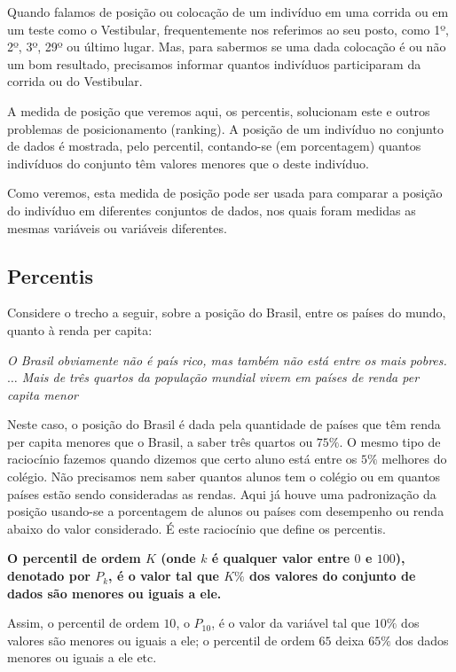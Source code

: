 \documentclass[
]{book}
\begin{document}
Quando falamos de posição ou colocação de um indivíduo em uma corrida ou em um teste como o Vestibular, frequentemente nos referimos ao seu posto, como 1º, 2º, 3º, 29º ou último lugar. Mas, para sabermos se uma dada colocação é ou não um bom resultado, precisamos informar quantos indivíduos participaram da corrida ou do Vestibular.

A medida de posição que veremos aqui, os percentis, solucionam este e outros problemas de posicionamento (ranking). A posição de um indivíduo no conjunto de dados é mostrada, pelo percentil, contando-se (em porcentagem) quantos indivíduos do conjunto têm valores menores que o deste indivíduo.

Como veremos, esta medida de posição pode ser usada para comparar a posição do indivíduo em diferentes conjuntos de dados, nos quais foram medidas as mesmas variáveis ou variáveis diferentes.

\hypertarget{percentis}{%
\subsection{Percentis}\label{percentis}}

Considere o trecho a seguir, sobre a posição do Brasil, entre os países do mundo, quanto à renda per capita:

\emph{O Brasil obviamente não é país rico, mas também não está entre os mais pobres. \(\ldots\) Mais de três quartos da população mundial vivem em países de renda per capita menor}

Neste caso, o posição do Brasil é dada pela quantidade de países que têm renda per capita menores que o Brasil, a saber três quartos ou \(75\%\). O mesmo tipo de raciocínio fazemos quando dizemos que certo aluno está entre os \(5\%\) melhores do colégio. Não precisamos nem saber quantos alunos tem o colégio ou em quantos países estão sendo consideradas as rendas. Aqui já houve uma padronização da posição usando-se a porcentagem de alunos ou países com desempenho ou renda abaixo do valor considerado. É este raciocínio que define os percentis.

\textbf{O percentil de ordem $K$ (onde $k$ é qualquer valor entre $0$ e $100$), denotado por $P_k$, é o valor tal que $K\%$ dos valores do conjunto de dados são menores ou iguais a ele.}

Assim, o percentil de ordem \(10\), o \(P_{10}\), é o valor da variável tal que \(10\%\) dos valores são menores ou iguais a ele; o percentil de ordem \(65\) deixa \(65\%\) dos dados menores ou iguais a ele etc.
\end{document}
